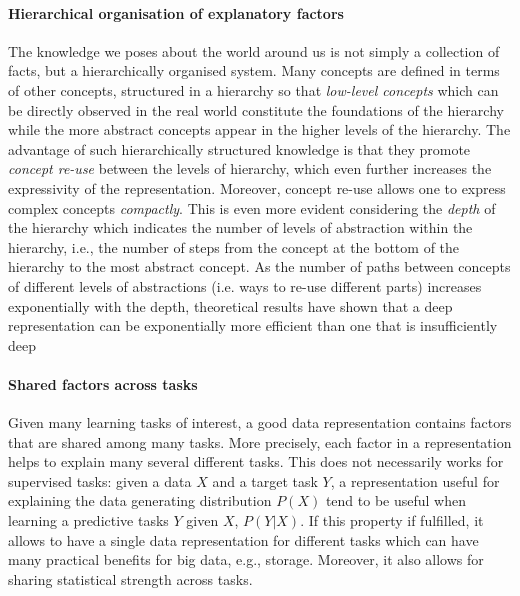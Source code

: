 \paragraph{\textbf{Hierarchical organisation of explanatory factors}}
The knowledge we poses about the world around us is not simply a collection of facts, but a hierarchically organised system.
Many concepts are defined in terms of other concepts, structured in a hierarchy so that \textit{low-level concepts} which can be directly observed in the real world constitute the foundations of the hierarchy while the more abstract concepts appear in the higher levels of the hierarchy.
The advantage of such hierarchically structured knowledge is that they promote \textit{concept re-use} between the levels of hierarchy, which even further increases the expressivity of the representation.
Moreover, concept re-use allows one to express complex concepts \textit{compactly}.
This is even more evident considering the \textit{depth} of the hierarchy which indicates the number of levels of abstraction within the hierarchy, i.e., the number of steps from the concept at the bottom of the hierarchy to the most abstract concept.
As the number of paths between concepts of different levels of abstractions (i.e. ways to re-use different parts) increases exponentially with the depth, theoretical results have shown that a deep representation can be exponentially more efficient than one that is insufficiently deep \cite{Hastad:1986:AOL:12130.12132,89582,Bengio:2011:EPD:2050345.2050349}





\paragraph{\textbf{Shared factors across tasks}}
Given many learning tasks of interest, a good data representation contains factors that are shared among many tasks.
More precisely, each factor in a representation helps to explain many several different tasks.
This does not necessarily works for supervised tasks: given a data $X$ and a target task $Y$, a representation useful for explaining the data generating distribution $P(X)$ tend to be useful when learning a predictive tasks $Y$ given $X$, $P(Y|X)$.
If this property if fulfilled, it allows to have a single data representation for different tasks which can have many practical benefits for big data, e.g., storage.
Moreover, it also allows for sharing statistical strength across tasks.
 



